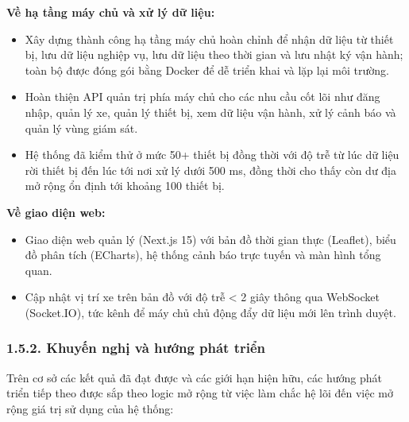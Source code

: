 \documentclass[a4paper]{extarticle}
\providecommand{\tightlist}{%
  \setlength{\itemsep}{0pt}\setlength{\parskip}{0pt}}
\begin{document}
\textbf{Về hạ tầng máy chủ và xử lý dữ liệu:}

\begin{itemize}
\tightlist
\item
  Xây dựng thành công hạ tầng máy chủ hoàn chỉnh để nhận dữ liệu từ
  thiết bị, lưu dữ liệu nghiệp vụ, lưu dữ liệu theo thời gian và lưu
  nhật ký vận hành; toàn bộ được đóng gói bằng Docker để dễ triển khai
  và lặp lại môi trường.
\item
  Hoàn thiện API quản trị phía máy chủ cho các nhu cầu cốt lõi như đăng
  nhập, quản lý xe, quản lý thiết bị, xem dữ liệu vận hành, xử lý cảnh
  báo và quản lý vùng giám sát.
\item
  Hệ thống đã kiểm thử ở mức 50+ thiết bị đồng thời với độ trễ từ lúc dữ
  liệu rời thiết bị đến lúc tới nơi xử lý dưới 500 ms, đồng thời cho
  thấy còn dư địa mở rộng ổn định tới khoảng 100 thiết bị.
\end{itemize}

\textbf{Về giao diện web:}

\begin{itemize}
\tightlist
\item
  Giao diện web quản lý (Next.js 15) với bản đồ thời gian thực
  (Leaflet), biểu đồ phân tích (ECharts), hệ thống cảnh báo trực tuyến
  và màn hình tổng quan.
\item
  Cập nhật vị trí xe trên bản đồ với độ trễ \textless{} 2 giây thông qua
  WebSocket (Socket.IO), tức kênh để máy chủ chủ động đẩy dữ liệu mới lên
  trình duyệt.
\end{itemize}

\subsubsection{1.5.2. Khuyến nghị và hướng phát
triển}\label{152-khuyux1ebfn-nghux1ecb-vuxe0-hux1b0ux1edbng-phuxe1t-triux1ec3n}

Trên cơ sở các kết quả đã đạt được và các giới hạn hiện hữu, các hướng phát
triển tiếp theo được sắp theo logic mở rộng từ việc làm chắc hệ lõi đến
việc mở rộng giá trị sử dụng của hệ thống:
\end{document}
